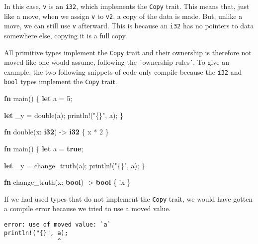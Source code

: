 \documentclass[a4paper,]{book}
\newenvironment{Shaded}{\begin{snugshade}}{\end{snugshade}}
\newcommand{\KeywordTok}[1]{\textcolor[rgb]{0.13,0.29,0.53}{\textbf{{#1}}}}
\newcommand{\DecValTok}[1]{\textcolor[rgb]{0.00,0.00,0.81}{{#1}}}
\newcommand{\StringTok}[1]{\textcolor[rgb]{0.31,0.60,0.02}{{#1}}}
\newcommand{\OtherTok}[1]{\textcolor[rgb]{0.56,0.35,0.01}{{#1}}}
\newcommand{\NormalTok}[1]{{#1}}
\begin{document}
In this case, \texttt{v} is an \texttt{i32}, which implements the
\texttt{Copy} trait. This means that, just like a move, when we assign
\texttt{v} to \texttt{v2}, a copy of the data is made. But, unlike a
move, we can still use \texttt{v} afterward. This is because an
\texttt{i32} has no pointers to data somewhere else, copying it is a
full copy.

All primitive types implement the \texttt{Copy} trait and their
ownership is therefore not moved like one would assume, following the
´ownership rules´. To give an example, the two following snippets of
code only compile because the \texttt{i32} and \texttt{bool} types
implement the \texttt{Copy} trait.

\begin{Shaded}
\begin{Highlighting}[]
\KeywordTok{fn} \NormalTok{main() \{}
    \KeywordTok{let} \NormalTok{a = }\DecValTok{5}\NormalTok{;}

    \KeywordTok{let} \NormalTok{_y = double(a);}
    \OtherTok{println!}\NormalTok{(}\StringTok{"\{\}"}\NormalTok{, a);}
\NormalTok{\}}

\KeywordTok{fn} \NormalTok{double(x: }\KeywordTok{i32}\NormalTok{) -> }\KeywordTok{i32} \NormalTok{\{}
    \NormalTok{x * }\DecValTok{2}
\NormalTok{\}}
\end{Highlighting}
\end{Shaded}

\begin{Shaded}
\begin{Highlighting}[]
\KeywordTok{fn} \NormalTok{main() \{}
    \KeywordTok{let} \NormalTok{a = }\KeywordTok{true}\NormalTok{;}

    \KeywordTok{let} \NormalTok{_y = change_truth(a);}
    \OtherTok{println!}\NormalTok{(}\StringTok{"\{\}"}\NormalTok{, a);}
\NormalTok{\}}

\KeywordTok{fn} \NormalTok{change_truth(x: }\KeywordTok{bool}\NormalTok{) -> }\KeywordTok{bool} \NormalTok{\{}
    \NormalTok{!x}
\NormalTok{\}}
\end{Highlighting}
\end{Shaded}

If we had used types that do not implement the \texttt{Copy} trait, we
would have gotten a compile error because we tried to use a moved value.

\begin{verbatim}
error: use of moved value: `a`
println!("{}", a);
               ^
\end{verbatim}
\end{document}
